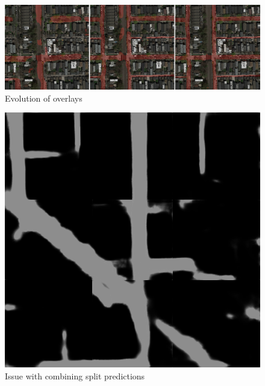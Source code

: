\documentclass[10pt,conference,compsocconf]{IEEEtran}
\begin{document}
\begin{figure}
    \centering
    \includegraphics[scale=0.17]{improvement.png}
    \caption{Evolution of overlays}
    \label{fig:overlays}
\end{figure}

\begin{figure}
    \centering
    \includegraphics[scale=0.20]{logit_049.png}
    \caption{Issue with combining split predictions}
    \label{fig:four-split}
\end{figure}
\end{document}
